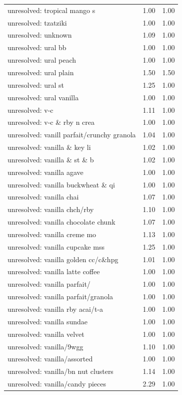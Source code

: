 \begin{table}
\begin{tabular}{lrr}
unresolved: tropical mango s & 1.00 & 1.00 \\
unresolved: tzatziki & 1.00 & 1.00 \\
unresolved: unknown & 1.09 & 1.00 \\
unresolved: ural bb & 1.00 & 1.00 \\
unresolved: ural peach & 1.00 & 1.00 \\
unresolved: ural plain & 1.50 & 1.50 \\
unresolved: ural st & 1.25 & 1.00 \\
unresolved: ural vanilla & 1.00 & 1.00 \\
unresolved: v-c & 1.11 & 1.00 \\
unresolved: v-c \& rby n crea & 1.00 & 1.00 \\
unresolved: vanill parfait/crunchy granola & 1.04 & 1.00 \\
unresolved: vanilla \& key li & 1.02 & 1.00 \\
unresolved: vanilla \& st \& b & 1.02 & 1.00 \\
unresolved: vanilla agave & 1.00 & 1.00 \\
unresolved: vanilla buckwheat \& qi & 1.00 & 1.00 \\
unresolved: vanilla chai & 1.07 & 1.00 \\
unresolved: vanilla chch/rby & 1.10 & 1.00 \\
unresolved: vanilla chocolate chunk & 1.07 & 1.00 \\
unresolved: vanilla creme mo & 1.13 & 1.00 \\
unresolved: vanilla cupcake mss & 1.25 & 1.00 \\
unresolved: vanilla golden cc/c\&hpg & 1.01 & 1.00 \\
unresolved: vanilla latte coffee & 1.00 & 1.00 \\
unresolved: vanilla parfait/ & 1.00 & 1.00 \\
unresolved: vanilla parfait/granola & 1.00 & 1.00 \\
unresolved: vanilla rby acai/t-a & 1.00 & 1.00 \\
unresolved: vanilla sundae & 1.00 & 1.00 \\
unresolved: vanilla velvet & 1.00 & 1.00 \\
unresolved: vanilla/9wgg & 1.10 & 1.00 \\
unresolved: vanilla/assorted & 1.00 & 1.00 \\
unresolved: vanilla/bn nut clusters & 1.14 & 1.00 \\
unresolved: vanilla/candy pieces & 2.29 & 1.00 \\

\end{tabular}
\end{table}
